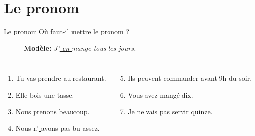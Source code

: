 \documentclass{beamer}
\begin{document}
  \section{Le pronom }
    \begin{frame}{Le pronom }
      Où faut-il mettre le pronom ?
      \begin{description}
        \item[] \textbf{Modèle:} \emph{J'\underline{ en } mange \underline{\hspace{0.5cm}} tous les jours.}
      \end{description}
      \begin{columns}[t]
        \scriptsize
          \begin{enumerate}
            \item Tu \underline{\hspace{0.35cm}} vas \underline{  } prendre \underline{\hspace{0.35cm}} au restaurant.
            \item Elle \underline{  } bois \underline{\hspace{0.35cm}} une tasse.
            \item Nous \underline{  } prenons \underline{\hspace{0.35cm}} beaucoup.
            \item Nous \underline{\hspace{0.35cm}} n'\underline{  } avons \underline{\hspace{0.35cm}} pas \underline{\hspace{0.35cm}} bu \underline{\hspace{0.35cm}} assez.
          \end{enumerate}
          \begin{enumerate}
            \setcounter{enumi}{4}
            \item Ils \underline{\hspace{0.35cm}} peuvent \underline{  } commander \underline{\hspace{0.35cm}} avant 9h du soir.
            \item Vous \underline{  } avez \underline{\hspace{0.35cm}} mangé \underline{\hspace{0.35cm}} dix.
            \item Je \underline{\hspace{0.35cm}} ne \underline{\hspace{0.35cm}} vais \underline{\hspace{0.35cm}} pas \underline{  } servir \underline{\hspace{0.35cm}} quinze.

\end{enumerate}
\end{columns}
\end{frame}
\end{document}
